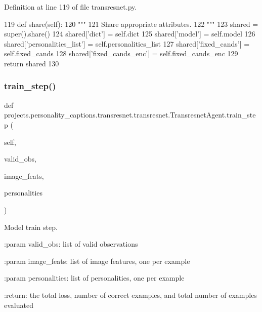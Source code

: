 Definition at line 119 of file transresnet.\+py.


\begin{DoxyCode}
119     \textcolor{keyword}{def }share(self):
120         \textcolor{stringliteral}{"""}
121 \textcolor{stringliteral}{        Share appropriate attributes.}
122 \textcolor{stringliteral}{        """}
123         shared = super().share()
124         shared[\textcolor{stringliteral}{'dict'}] = self.dict
125         shared[\textcolor{stringliteral}{'model'}] = self.model
126         shared[\textcolor{stringliteral}{'personalities\_list'}] = self.personalities\_list
127         shared[\textcolor{stringliteral}{'fixed\_cands'}] = self.fixed\_cands
128         shared[\textcolor{stringliteral}{'fixed\_cands\_enc'}] = self.fixed\_cands\_enc
129         \textcolor{keywordflow}{return} shared
130 
\end{DoxyCode}
\mbox{\label{classprojects_1_1personality__captions_1_1transresnet_1_1transresnet_1_1TransresnetAgent_a5953c4f5ae44faf51f47e61194ada84e}} 
\subsubsection{\texorpdfstring{train\+\_\+step()}{train\_step()}}
{\footnotesize\ttfamily def projects.\+personality\+\_\+captions.\+transresnet.\+transresnet.\+Transresnet\+Agent.\+train\+\_\+step (\begin{DoxyParamCaption}\item[{}]{self,  }\item[{}]{valid\+\_\+obs,  }\item[{}]{image\+\_\+feats,  }\item[{}]{personalities }\end{DoxyParamCaption})}

\begin{DoxyVerb}Model train step.

:param valid_obs:
    list of valid observations

:param image_feats:
    list of image features, one per example

:param personalities:
    list of personalities, one per example

:return:
    the total loss, number of correct examples, and total number of
    examples evaluated
\end{DoxyVerb}
 


